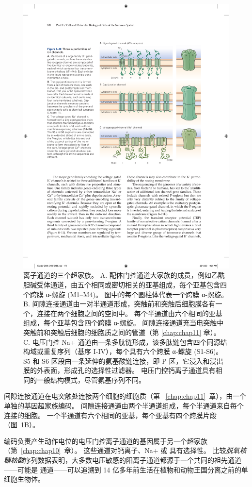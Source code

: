 \begin{figure}[htbp]
	\centering
	\includegraphics[width=0.7\linewidth]{chap08/fig_8_10}
	\caption{离子通道的三个超家族。 A. 配体门控通道大家族的成员，例如乙酰胆碱受体通道，由五个相同或密切相关的亚基组成，每个亚基包含四个跨膜 α-螺旋 (M1–M4)。 图中的每个圆柱体代表一个跨膜 α-螺旋。 B. 间隙连接通道由一对半通道形成，突触前和突触后细胞膜各有一个，连接在两个细胞之间的空间中。 每个半通道由六个相同的亚基组成，每个亚基包含四个跨膜 α-螺旋。 间隙连接通道充当电突触中突触前和突触后细胞的细胞质之间的管道（第 \ref{chap:chap11} 章）。 C. 电压门控 Na+ 通道由一条多肽链形成，该多肽链包含四个同源结构域或重复序列（基序 I-IV），每个具有六个跨膜 α-螺旋 (S1-S6)。 S5 和 S6 区段由一条延伸的氨基酸链连接，即 P 区，它浸入和浸出膜的外表面，形成孔的选择性过滤器。 电压门控钙离子通道具有相同的一般结构模式，尽管氨基序列不同。}
	\label{fig:8_10}
\end{figure}




间隙连接通道在电突触处连接两个细胞的细胞质（第 ~\ref{chap:chap11}~章），由一个单独的基因超家族编码。
间隙连接通道由两个半通道组成，每个半通道来自每个连接的细胞。
一个半通道有六个相同的亚基，每个亚基有四个跨膜片段（图~\ref{fig:8_10}B）。


编码负责产生动作电位的电压门控离子通道的基因属于另一个超家族（第~\ref{chap:chap10}~章）。
这些通道对钙离子、Na+ 或  具有选择性。
比较\textit{脱氧核糖核酸}序列数据表明，大多数电压敏感的阳离子通道都源于一个共同的祖先通道——可能是  通道——可以追溯到 14 亿多年前生活在植物和动物王国分离之前的单细胞生物体。


